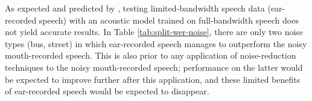 % 
% 

As expected and predicted by \cite{morales:05b}, testing limited-bandwidth speech data (ear-recorded speech) with an acoustic model trained on full-bandwidth speech does not yield accurate results.  In Table \ref{tab:split-wer-noise}, there are only two noise types (bus, street) in which ear-recorded speech manages to outperform the noisy mouth-recorded speech.  This is also prior to any application of noise-reduction techniques to the noisy mouth-recorded speech; performance on the latter would be expected to improve further after this application, and these limited benefits of ear-recorded speech would be expected to disappear.

